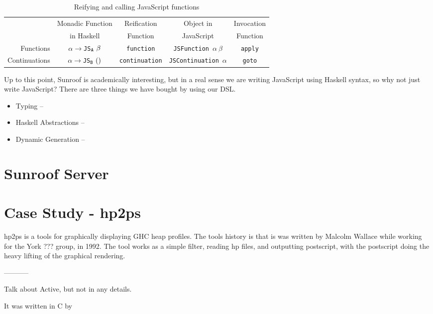 \documentclass{llncs}
\begin{document}
\begin{table}
\caption{Reifying and calling JavaScript functions}
\begin{center}
\begin{tabular}{r@{\quad}c@{\quad}c@{\quad}c@{\quad}c}
\hline\rule{0pt}{12pt}%

                & Monadic Function      & Reification   & Object in     & Invocation\\
                & in Haskell            & Function      & JavaScript    & Function\\
\hline\rule{0pt}{12pt}%
Functions       & $\alpha\rightarrow${\tt JS}$_{\tt A}~\beta$
                                        & \verb|function|
                                                        & \verb|JSFunction|~$\alpha~\beta$
                                                                        & \verb|apply|\\
Continuations   & $\alpha\rightarrow${\tt JS}$_{\tt B}~()$
                                        & \verb|continuation|
                                                        & \verb|JSContinuation|~$\alpha$
                                                                        & \verb|goto|\\
\hline
\end{tabular}
\end{center}
\end{table} 

Up to this point, Sunroof is academically interesting, but in a real sense
we are writing JavaScript using Haskell syntax, so why not just write
JavaScript? There are three things we have bought by using our DSL.
\begin{itemize}
\item Typing --
\item Haskell Abstractions --
\item Dynamic Generation -- 
\end{itemize}

\section{Sunroof Server}





\section{Case Study - hp2ps}

hp2ps is a tools for graphically displaying GHC heap profiles.
The tools history is that is was written by Malcolm Wallace while working
for the York ??? group, in 1992. The tool works as a simple filter,
reading hp files, and outputting postscript, with the postscript
doing the heavy lifting of the graphical rendering.

-----------


Talk about Active, but not in any details.






 It was written
in C by 




%
%
\end{document}
